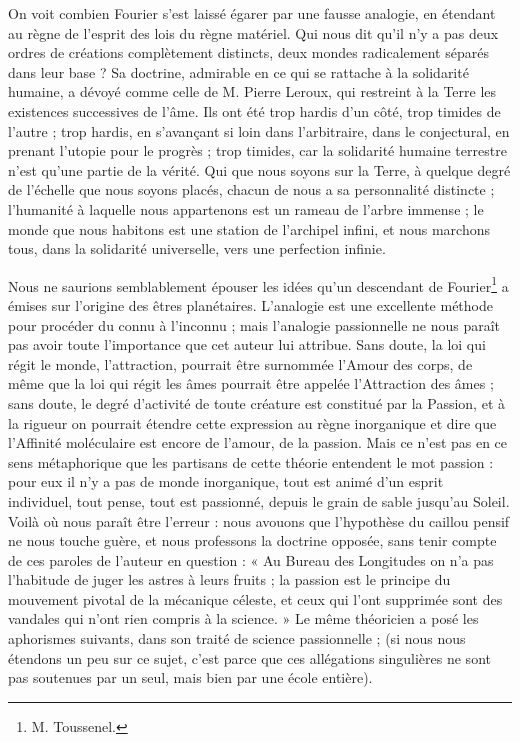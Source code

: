 \documentclass[a4paper, 11pt, oneside, landscape]{article}
\begin{document}
On voit combien Fourier s'est laissé égarer par une fausse analogie, en étendant au règne de l'esprit des lois du règne matériel. Qui nous dit qu'il n'y a pas deux ordres de créations complètement distincts, deux mondes radicalement séparés dans leur base ? Sa doctrine, admirable en ce qui se rattache à la solidarité humaine, a dévoyé comme celle de M. Pierre Leroux, qui restreint à la Terre les existences successives de l'âme. Ils ont été trop hardis d'un côté, trop timides de l'autre ; trop hardis, en s'avançant si loin dans l'arbitraire, dans le conjectural, en prenant l'utopie pour le progrès ; trop timides, car la solidarité humaine terrestre n'est qu'une partie de la vérité. Qui que nous soyons sur la Terre, à quelque degré de l'échelle que nous soyons placés, chacun de nous a sa personnalité distincte ; l'humanité à laquelle nous appartenons est un rameau de l'arbre immense ; le monde que nous habitons est une station de l'archipel infini, et nous marchons tous, dans la solidarité universelle, vers une perfection infinie.

Nous ne saurions semblablement épouser les idées qu'un descendant de Fourier\footnote{M. Toussenel.} a émises sur l'origine des êtres planétaires. L'analogie est une excellente méthode pour procéder du connu à l'inconnu ; mais l'analogie passionnelle ne nous paraît pas avoir toute l'importance que cet auteur lui attribue. Sans doute, la loi qui régit le monde, l'attraction, pourrait être surnommée l'Amour des corps, de même que la loi qui régit les âmes pourrait être appelée l'Attraction des âmes ; sans doute, le degré d'activité de toute créature est constitué par la Passion, et à la rigueur on pourrait étendre cette expression au règne inorganique et dire que l'Affinité moléculaire est encore de l'amour, de la passion. Mais ce n'est pas en ce sens métaphorique que les partisans de cette théorie entendent le mot passion : pour eux il n'y a pas de monde inorganique, tout est animé d'un esprit individuel, tout pense, tout est passionné, depuis le grain de sable jusqu'au Soleil. Voilà où nous paraît être l'erreur : nous avouons que l'hypothèse du caillou pensif ne nous touche guère, et nous professons la doctrine opposée, sans tenir compte de ces paroles de l'auteur en question : « Au Bureau des Longitudes on n'a pas l'habitude de juger les astres à leurs fruits ; la passion est le principe du mouvement pivotal de la mécanique céleste, et ceux qui l'ont supprimée sont des vandales qui n'ont rien compris à la science. » Le même théoricien a posé les aphorismes suivants, dans son traité de science passionnelle ; (si nous nous étendons un peu sur ce sujet, c'est parce que ces allégations singulières ne sont pas soutenues par un seul, mais bien par une école entière).
\end{document}

